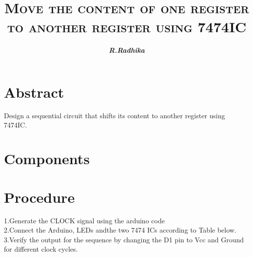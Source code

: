 \documentclass{article}
\title{\textbf{\textsc{Move the content of one register to another register using 7474IC}}}
\author{\textit{\textbf{R.Radhika}}}
\begin{document}
\maketitle
\section{Abstract}
Design a sequential circuit that shifts its content to another register using 7474IC.
\section{Components}
\begin{table}[ht]
\caption{}
\label{Tabel-1}
\end{table}
\section{Procedure}
1.Generate the CLOCK signal using the arduino code
\\
2.Connect the Arduino, LEDs andthe two 7474 ICs according to Table below.
\\
3.Verify the output for the sequence by changing the D1 pin to Vcc and Ground for different clock cycles.
\\
\end{document}
